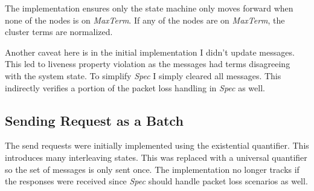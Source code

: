 The implementation ensures only the state machine only moves forward when none
of the nodes is on \textit{MaxTerm}. If any of the nodes are on \textit{MaxTerm},
the cluster terms are normalized.\newline

Another caveat here is in the initial implementation I didn't update messages.
This led to liveness property violation as the messages had terms disagreeing
with the system state. To simplify \textit{Spec} I simply cleared all messages. This 
indirectly verifies a portion of the packet loss handling in \textit{Spec} as well.

\subsection{Sending Request as a Batch}

The send requests were initially implemented using the existential quantifier. 
This introduces many interleaving states. This was replaced with a universal
quantifier so the set of messages is only sent once. The implementation no
longer tracks if the responses were received since \textit{Spec} should handle
packet loss scenarios as well.\\

